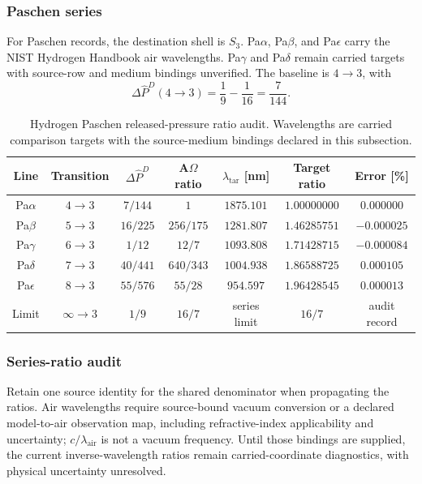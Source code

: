\subsubsection{Paschen series}\label{manual:hydrogen:paschen}
For Paschen records, the destination shell is \(S_3\). Pa\(\alpha\), Pa\(\beta\), and Pa\(\epsilon\) carry the NIST Hydrogen Handbook air wavelengths. Pa\(\gamma\) and Pa\(\delta\) remain carried targets with source-row and medium bindings unverified. The baseline is \(4\to3\), with
\[
\Delta\widehat P^D(4\to3)=\frac19-\frac1{16}=\frac7{144}.
\]

\begin{table}[h]
\centering
\scriptsize
\caption{Hydrogen Paschen released-pressure ratio audit. Wavelengths are carried comparison targets with the source-medium bindings declared in this subsection.}
\begin{tabular}{c c c c c c c}
\toprule
Line & Transition & $\Delta\widehat P^D$ & A\(\Omega\) ratio & $\lambda_{\mathrm{tar}}$ [nm] & Target ratio & Error [\%]\\
\midrule
Pa$\alpha$ & $4\to3$ & $7/144$ & $1$ & $1875.101$ & $1.00000000$ & $0.000000$\\
Pa$\beta$ & $5\to3$ & $16/225$ & $256/175$ & $1281.807$ & $1.46285751$ & $-0.000025$\\
Pa$\gamma$ & $6\to3$ & $1/12$ & $12/7$ & $1093.808$ & $1.71428715$ & $-0.000084$\\
Pa$\delta$ & $7\to3$ & $40/441$ & $640/343$ & $1004.938$ & $1.86588725$ & $0.000105$\\
Pa$\epsilon$ & $8\to3$ & $55/576$ & $55/28$ & $954.597$ & $1.96428545$ & $0.000013$\\
Limit & $\infty\to3$ & $1/9$ & $16/7$ & series limit & $16/7$ & audit record\\
\bottomrule
\end{tabular}
\label{tab:manual-hydrogen-paschen-ratios}
\end{table}

\subsubsection{Series-ratio audit}\label{manual:hydrogen:series-audit}
Retain one source identity for the shared denominator when propagating the
ratios. Air wavelengths require source-bound vacuum conversion or a declared
model-to-air observation map, including refractive-index applicability and
uncertainty; \(c/\lambda_{\mathrm{air}}\) is not a vacuum frequency. Until
those bindings are supplied, the current inverse-wavelength ratios remain
carried-coordinate diagnostics, with physical uncertainty unresolved.


